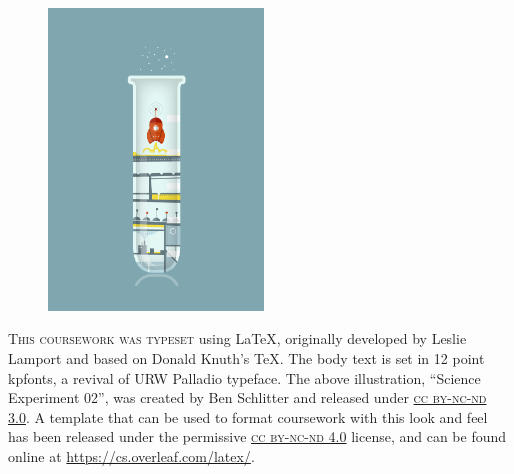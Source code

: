 \newpage
\pagestyle{empty}
\begin{figure}
  \vspace{50pt}
  \centering
  \includegraphics[width=0.51\textwidth]{./figures/colophon}
\end{figure}


\begin{center}
\parbox{200pt}{\lettrine[lines=3,slope=-2pt,nindent=-4pt]{\textcolor{uni-color}{T}}{his coursework was typeset} using LaTeX, originally developed by Leslie Lamport and based on Donald Knuth's TeX. The body text is set in 12 point kpfonts, a revival of URW Palladio typeface. The above illustration, ``Science Experiment 02'', was created by Ben Schlitter and released under \href{http://creativecommons.org/licenses/by-nc-nd/3.0/}{\textsc{cc by-nc-nd 3.0}}. A template that can be used to format coursework with this look and feel has been released under the permissive \href{http://creativecommons.org/licenses/by-nc-nd/4.0/}{\textsc{cc by-nc-nd 4.0}} license, and can be found online at \href{https://cs.overleaf.com/latex/templates/maths-coursework-template/kbyhcwmjdtpf}{https://cs.overleaf.com/latex/}.}
\end{center}